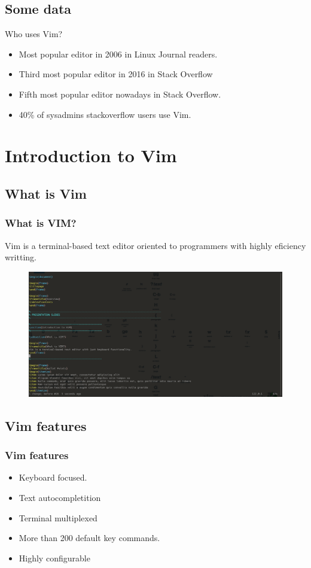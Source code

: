 \documentclass{beamer}
\begin{document}
\subsection{Some data}
\begin{frame}{Who uses Vim?}
    \begin{itemize}
        \item Most popular editor in 2006 in Linux Journal readers.
        \item Third most popular editor in 2016 in Stack Overflow
        \item Fifth most popular editor nowadays in Stack Overflow.
        \item 40\% of sysadmins stackoverflow users use Vim.
    \end{itemize}
\end{frame}
\section{Introduction to Vim}

\subsection{What is Vim} 

\begin{frame}
\frametitle{What is VIM?}
Vim is a terminal-based text editor oriented to programmers with highly eficiency writting.
\begin{figure}
\includegraphics[width=0.8\linewidth]{vimscreenshot.png}
\end{figure}
\end{frame}

\subsection{Vim features}
\begin{frame}
\frametitle{Vim features}
\begin{itemize}
\item Keyboard focused.
\item Text autocompletition 
\item Terminal multiplexed
\item More than 200 default key commands.
\item Highly configurable
\end{itemize}
\end{frame}

\end{document}
